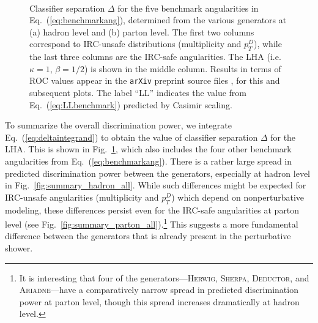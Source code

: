 \documentclass[11pt,letterpaper]{article}
\DeclareRobustCommand{\Fig}[1]{Fig.~\ref{#1}}
\DeclareRobustCommand{\Eq}[1]{Eq.~(\ref{#1})}
\begin{document}
\begin{figure}
\centering
{}
$\qquad$
\caption{Classifier separation $\Delta$ for the five benchmark angularities in \Eq{eq:benchmarkang}, determined from the various generators at (a) hadron level and (b) parton level.  The first two columns correspond to IRC-unsafe distributions (multiplicity and $p_T^D$), while the last three columns are the IRC-safe angularities.  The LHA (i.e.~$\kappa = 1$, $\beta = 1/2$) is shown in the middle column.  Results in terms of ROC values appear in the \texttt{arXiv} preprint source files \cite{ArXivSource}, for this and subsequent plots.  The label ``LL''  indicates the value from \Eq{eq:LLbenchmark} predicted by Casimir scaling.}
\label{fig:summary_all}
\end{figure}

To summarize the overall discrimination power, we integrate
\Eq{eq:deltaintegrand} to obtain the value of
classifier separation $\Delta$ for the LHA.  This is shown in
\Fig{fig:summary_all}, which also includes the four
other benchmark angularities from
\Eq{eq:benchmarkang}.  There is a rather large
spread in predicted discrimination power between the generators,
especially at hadron level in
\Fig{fig:summary_hadron_all}.  While such differences
might be expected for IRC-unsafe angularities (multiplicity and
$p_T^D$) which depend on nonperturbative modeling, these differences
persist even for the IRC-safe angularities at parton level (see
\Fig{fig:summary_parton_all}).\footnote{It is interesting that four of the generators---\textsc{Herwig}, \textsc{Sherpa}, \textsc{Deductor}, and \textsc{Ariadne}---have a comparatively narrow spread in predicted discrimination power at parton level, though this spread increases dramatically at hadron level.}  This suggests a more
fundamental difference between the generators that is already present
in the perturbative shower.
\end{document}
